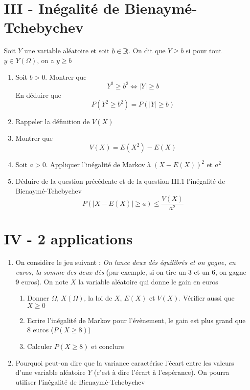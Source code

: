 \section*{III - Inégalité de Bienaymé-Tchebychev}
Soit $Y$ une variable aléatoire et soit $b \in \mathbb{R}$. On dit que $Y \geq b$ si pour tout $y \in Y(\Omega)$, on a $y \geq b$
\begin{enumerate}
\item Soit $b> 0$. Montrer que 
$$\boxed{Y^2 \geq b^2 \Leftrightarrow |Y| \geq b}$$
En déduire que $$P(Y^2 \geq b^2) = P(|Y| \geq b)$$
\item Rappeler la définition de $V(X)$
\item Montrer que $$V(X) = E(X^2)-E(X)$$
\item Soit $a > 0$. Appliquer l'inégalité de Markov à $(X-E(X))^2$ et $a^2$
\item Déduire de la question précédente et de la question III.1 l'inégalité de Bienaymé-Tchebychev $$\boxed{P(|X - E(X)| \geq a) \leq \frac{V(X)}{a^2}}$$
\end{enumerate}
\section*{IV - 2 applications}
\begin{enumerate}
\item On considère le jeu suivant : \emph{On lance deux dés équilibrés et on gagne, en euros, la somme des deux dés} (par exemple, si on tire un 3 et un 6, on gagne 9 euros). On note $X$ la variable aléatoire qui donne le gain en euros 
\begin{enumerate}
\item Donner $\Omega$, $X(\Omega)$, la loi de $X$, $E(X)$ et $V(X)$. Vérifier aussi que $X \geq 0$
\item Ecrire l'inégalité de Markov pour l'évènement, le gain est plus grand que 8 euros ($P(X \geq 8)$)
\item Calculer $P(X \geq 8)$ et conclure
\end{enumerate}
\item Pourquoi peut-on dire que la variance caractérise l'écart entre les valeurs d'une variable aléatoire $Y$ (c'est à dire l'écart à l'espérance). On pourra utiliser l'inégalité de Bienaymé-Tchebychev
\end{enumerate}
